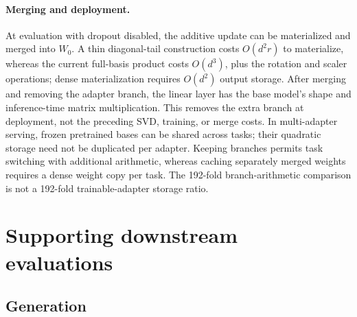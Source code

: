\documentclass{article}
\begin{document}
\paragraph{Merging and deployment.}
At evaluation with dropout disabled, the additive update can be materialized and merged into $W_0$. A thin diagonal-tail construction costs $O(d^2r)$ to materialize, whereas the current full-basis product costs $O(d^3)$, plus the rotation and scaler operations; dense materialization requires $O(d^2)$ output storage. After merging and removing the adapter branch, the linear layer has the base model's shape and inference-time matrix multiplication. This removes the extra branch at deployment, not the preceding SVD, training, or merge costs. In multi-adapter serving, frozen pretrained bases can be shared across tasks; their quadratic storage need not be duplicated per adapter. Keeping branches permits task switching with additional arithmetic, whereas caching separately merged weights requires a dense weight copy per task. The 192-fold branch-arithmetic comparison is not a 192-fold trainable-adapter storage ratio.
\section{Supporting downstream evaluations}
\label{app:downstream}
\subsection{Generation}
\label{app:generation}
\end{document}
